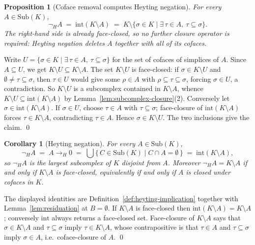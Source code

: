 \documentclass[final,12pt]{elsarticle}
\theoremstyle{plain}
\newtheorem{cor}[thm]{Corollary}
\newtheorem{prop}[thm]{Proposition}
\theoremstyle{definition}
\begin{document}
\begin{prop}[Coface removal computes Heyting negation]
\label{prop:coface-removal}
For every \(A \in \mathrm{Sub}(K)\),
\[
  \neg_H A
  \;=\; \mathrm{int}(K \setminus A)
  \;=\; K \setminus \{\sigma \in K \mid \exists\, \tau \in A,\ \tau \subseteq \sigma\}.
\]
The right-hand side is already face-closed, so no further closure operator is
required: Heyting negation deletes \(A\) together with all of its cofaces.
\end{prop}

\proof
Write \(U = \{\sigma \in K \mid \exists\, \tau \in A,\ \tau \subseteq \sigma\}\)
for the set of cofaces of simplices of \(A\). Since \(A \subseteq U\), we get
\(K \setminus U \subseteq K \setminus A\). The set \(K \setminus U\) is
face-closed: if \(\sigma \in K \setminus U\) and
\(\emptyset \neq \tau \subseteq \sigma\), then \(\tau \in U\) would give some
\(\rho \in A\) with \(\rho \subseteq \tau \subseteq \sigma\), forcing
\(\sigma \in U\), a contradiction. So \(K \setminus U\) is a subcomplex contained
in \(K \setminus A\), whence
\(K \setminus U \subseteq \mathrm{int}(K \setminus A)\) by
Lemma~\ref{lem:subcomplex-closure}(2). Conversely let
\(\sigma \in \mathrm{int}(K \setminus A)\). If \(\sigma \in U\), choose
\(\tau \in A\) with \(\tau \subseteq \sigma\); face-closure of
\(\mathrm{int}(K \setminus A)\) forces \(\tau \in K \setminus A\), contradicting
\(\tau \in A\). Hence \(\sigma \in K \setminus U\). The two inclusions give the
claim.
\qed

\begin{cor}[Heyting negation]
\label{cor:heyting-negation}
For every \(A \in \mathrm{Sub}(K)\),
\[
  \neg_H A \;=\; A \to_H 0
  \;=\; \bigcup\{\, C \in \mathrm{Sub}(K) \mid C \cap A = \emptyset \,\}
  \;=\; \mathrm{int}(K \setminus A),
\]
so \(\neg_H A\) is the largest subcomplex of \(K\) disjoint from \(A\). Moreover
\(\neg_H A = K \setminus A\) if and only if \(K \setminus A\) is face-closed,
equivalently if and only if \(A\) is closed under cofaces in \(K\).
\end{cor}

\proof
The displayed identities are Definition~\ref{def:heyting-implication} together
with Lemma~\ref{lem:residuation} at \(B = \emptyset\). If \(K \setminus A\) is
face-closed then \(\mathrm{int}(K \setminus A) = K \setminus A\); conversely
\(\mathrm{int}\) always returns a face-closed set. Face-closure of
\(K \setminus A\) says that \(\sigma \in K \setminus A\) and
\(\tau \subseteq \sigma\) imply \(\tau \in K \setminus A\), whose contrapositive
is that \(\tau \in A\) and \(\tau \subseteq \sigma\) imply \(\sigma \in A\), i.e.\
coface-closure of \(A\).
\qed
\end{document}
